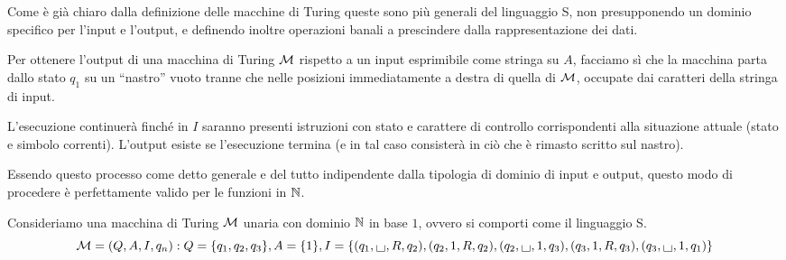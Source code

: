 
Come è già chiaro dalla definizione delle macchine di Turing queste sono più generali del linguaggio S, non presupponendo un dominio specifico per l'input e l'output, e definendo inoltre operazioni banali a prescindere dalla rappresentazione dei dati.

Per ottenere l'output di una macchina di Turing \(\mathcal{M}\) rispetto a un input esprimibile come stringa su \(A\), facciamo sì che la macchina parta dallo stato \(q_1\) su un ``nastro'' vuoto tranne che nelle posizioni immediatamente a destra di quella di \(\mathcal{M}\), occupate dai caratteri della stringa di input.

L'esecuzione continuerà finché in \(I\) saranno presenti istruzioni con stato e carattere di controllo corrispondenti alla situazione attuale (stato e simbolo correnti).
L'output esiste se l'esecuzione termina (e in tal caso consisterà in ciò che è rimasto scritto sul nastro).

Essendo questo processo come detto generale e del tutto indipendente dalla tipologia di dominio di input e output, questo modo di procedere è perfettamente valido per le funzioni in \(\mathbb{N}\).

Consideriamo una macchina di Turing \(\mathcal{M}\) unaria con dominio \(\mathbb{N}\) in base \(1\), ovvero si comporti come il linguaggio S.
\begin{equation*}
  \mcM = (Q,A,I,q_n) : Q = \cbrakets{q_1, q_2, q_3}, A = \cbrakets{1}, I=\cbrakets{(q_1, \text{\Large{\textbf{\textvisiblespace}}}, R,q_2), (q_2,1,R,q_2), (q_2, \text{\Large{\textbf{\textvisiblespace}}}, 1, q_3), (q_3,1, R, q_3), (q_3, \text{\Large{\textbf{\textvisiblespace}}} , 1, q_1)}
\end{equation*}

